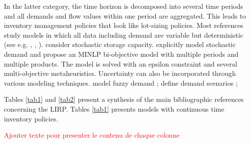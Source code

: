 \documentclass[a4paper,10pt]{article}
\begin{document}
\begin{linenumbers}
In the latter category, the time horizon is decomposed into several time periods and all demands and flow values within one period are aggregated. This leads to inventory management policies that look like lot-sizing policies. Most references study models in which all data including demand are variable but deterministic (see e.g. \cite{Guerrero2013}, \cite{Zhang2014}, \cite{Ghorbani2016}). 
\cite{Vahdani2018} consider stochastic storage capacity. 
\cite{Rayat2017} explicitly model stochastic demand and propose an MINLP bi-objective model with multiple periods and multiple products. The model is solved with an epsilon constraint and several multi-objective metaheuristics. 
Uncertainty can also be incorporated through various modeling techniques. 
\cite{ChenChenSunLiu2014, TavakkoliIFAC2016} model fuzzy demand ; \cite{Bashiri2018} define demand scenarios ; 


Tables \ref{tab1} and \ref{tab2} present a synthesis of the main bibliographic references concerning the LIRP. 
Tables \ref{tab1} presents models with continuous time inventory policies. 


\textcolor{red}{Ajouter texte pour presenter le contenu de chaque colonne}


\end{linenumbers}
\end{document}
